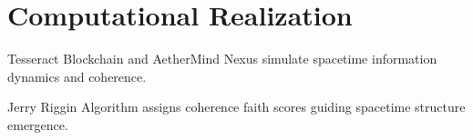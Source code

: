 \chapter{Computational Realization}

Tesseract Blockchain and AetherMind Nexus simulate spacetime information dynamics and coherence.

Jerry Riggin Algorithm assigns coherence faith scores guiding spacetime structure emergence.
